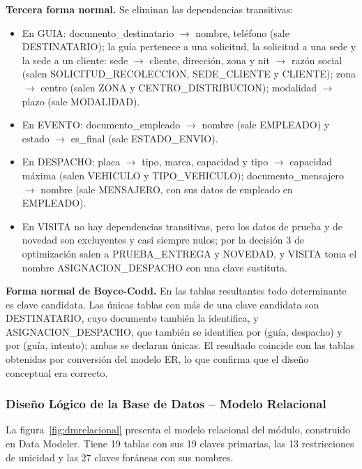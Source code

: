 \textbf{Tercera forma normal.} Se eliminan las dependencias
transitivas:

\begin{itemize}[leftmargin=1.2cm,itemsep=1pt]
  \item En GUIA: documento\_destinatario $\rightarrow$ nombre, teléfono
        (sale DESTINATARIO); la guía pertenece a una solicitud, la
        solicitud a una sede y la sede a un cliente: sede $\rightarrow$
        cliente, dirección, zona y nit $\rightarrow$ razón social (salen
        SOLICITUD\_RECOLECCION, SEDE\_CLIENTE y CLIENTE); zona
        $\rightarrow$ centro (salen ZONA y CENTRO\_DISTRIBUCION);
        modalidad $\rightarrow$ plazo (sale MODALIDAD).
  \item En EVENTO: documento\_empleado $\rightarrow$ nombre (sale
        EMPLEADO) y estado $\rightarrow$ es\_final (sale ESTADO\_ENVIO).
  \item En DESPACHO: placa $\rightarrow$ tipo, marca, capacidad y tipo
        $\rightarrow$ capacidad máxima (salen VEHICULO y TIPO\_VEHICULO);
        documento\_mensajero $\rightarrow$ nombre (sale MENSAJERO, con
        sus datos de empleado en EMPLEADO).
  \item En VISITA no hay dependencias transitivas, pero los datos de
        prueba y de novedad son excluyentes y casi siempre nulos; por la
        decisión 3 de optimización salen a PRUEBA\_ENTREGA y NOVEDAD, y
        VISITA toma el nombre ASIGNACION\_DESPACHO con una clave
        sustituta.
\end{itemize}

\textbf{Forma normal de Boyce-Codd.} En las tablas resultantes todo
determinante es clave candidata. Las únicas tablas con más de una clave
candidata son DESTINATARIO, cuyo documento también la identifica, y
ASIGNACION\_DESPACHO, que también se identifica por (guía, despacho) y
por (guía, intento); ambas se declaran únicas. El resultado coincide con
las tablas obtenidas por conversión del modelo ER, lo que confirma que
el diseño conceptual era correcto.


\subsubsection{Diseño Lógico de la Base de Datos -- Modelo Relacional}
\label{sec:esquemarel}

La figura~\ref{fig:dmrelacional} presenta el modelo relacional del
módulo, construido en Data Modeler. Tiene 19 tablas con sus 19 claves
primarias, las 13 restricciones de unicidad y las 27 claves foráneas con
sus nombres.


